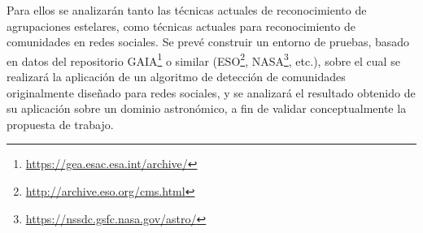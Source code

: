 \documentclass[
	11pt,oneside,a4paper
]{article}
\begin{document}

		
		
		



Para ellos se analizarán tanto las técnicas actuales de reconocimiento de agrupaciones estelares, como técnicas actuales para reconocimiento de comunidades en redes sociales. Se prevé construir un entorno de pruebas, basado en datos del repositorio GAIA\footnote{\url{https://gea.esac.esa.int/archive/}} o similar (ESO\footnote{\url{http://archive.eso.org/cms.html}}, NASA\footnote{\url{https://nssdc.gsfc.nasa.gov/astro/}}, etc.), sobre el cual se realizará la aplicación de un algoritmo de detección de comunidades originalmente diseñado para redes sociales, y se analizará el resultado obtenido de su aplicación sobre un dominio astronómico, a fin de validar conceptualmente la propuesta de trabajo.
\end{document}
